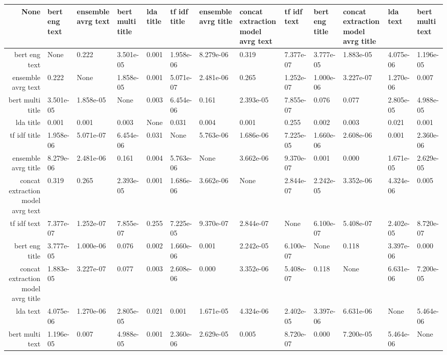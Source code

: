 \begin{tabular}{|r|l|l|l|l|l|l|l|l|l|l|l|l|}
  \hline
  None & bert eng text & ensemble avrg text & bert multi title & lda title & tf idf title & ensemble avrg title & concat extraction model avrg text & tf idf text & bert eng title & concat extraction model avrg title & lda text & bert multi text \\ 
  \hline
  bert eng text & None & 0.222 & 3.501e-05 & 0.001 & 1.958e-06 & 8.279e-06 & 0.319 & 7.377e-07 & 3.777e-05 & 1.883e-05 & 4.075e-06 & 1.196e-05 \\ 
  \hline
  ensemble avrg text & 0.222 & None & 1.858e-05 & 0.001 & 5.071e-07 & 2.481e-06 & 0.265 & 1.252e-07 & 1.000e-06 & 3.227e-07 & 1.270e-06 & 0.007 \\ 
  \hline
  bert multi title & 3.501e-05 & 1.858e-05 & None & 0.003 & 6.454e-06 & 0.161 & 2.393e-05 & 7.855e-07 & 0.076 & 0.077 & 2.805e-05 & 4.988e-05 \\ 
  \hline
  lda title & 0.001 & 0.001 & 0.003 & None & 0.031 & 0.004 & 0.001 & 0.255 & 0.002 & 0.003 & 0.021 & 0.001 \\ 
  \hline
  tf idf title & 1.958e-06 & 5.071e-07 & 6.454e-06 & 0.031 & None & 5.763e-06 & 1.686e-06 & 7.225e-05 & 1.660e-06 & 2.608e-06 & 0.001 & 2.360e-06 \\ 
  \hline
  ensemble avrg title & 8.279e-06 & 2.481e-06 & 0.161 & 0.004 & 5.763e-06 & None & 3.662e-06 & 9.370e-07 & 0.001 & 0.000 & 1.671e-05 & 2.629e-05 \\ 
  \hline
  concat extraction model avrg text & 0.319 & 0.265 & 2.393e-05 & 0.001 & 1.686e-06 & 3.662e-06 & None & 2.844e-07 & 2.242e-05 & 3.352e-06 & 4.324e-06 & 0.005 \\ 
  \hline
  tf idf text & 7.377e-07 & 1.252e-07 & 7.855e-07 & 0.255 & 7.225e-05 & 9.370e-07 & 2.844e-07 & None & 6.100e-07 & 5.408e-07 & 2.402e-05 & 8.720e-07 \\ 
  \hline
  bert eng title & 3.777e-05 & 1.000e-06 & 0.076 & 0.002 & 1.660e-06 & 0.001 & 2.242e-05 & 6.100e-07 & None & 0.118 & 3.397e-06 & 0.000 \\ 
  \hline
  concat extraction model avrg title & 1.883e-05 & 3.227e-07 & 0.077 & 0.003 & 2.608e-06 & 0.000 & 3.352e-06 & 5.408e-07 & 0.118 & None & 6.631e-06 & 7.200e-05 \\ 
  \hline
  lda text & 4.075e-06 & 1.270e-06 & 2.805e-05 & 0.021 & 0.001 & 1.671e-05 & 4.324e-06 & 2.402e-05 & 3.397e-06 & 6.631e-06 & None & 5.464e-06 \\ 
  \hline
  bert multi text & 1.196e-05 & 0.007 & 4.988e-05 & 0.001 & 2.360e-06 & 2.629e-05 & 0.005 & 8.720e-07 & 0.000 & 7.200e-05 & 5.464e-06 & None \\ 
  \hline
\end{tabular}

